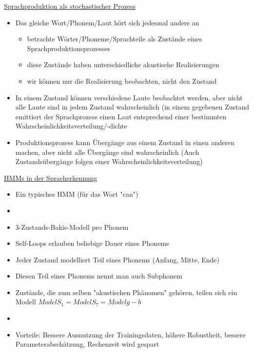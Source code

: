 \documentclass[a4paper,10pt,oneside]{article}
\begin{document}
\underline{Sprachproduktion als stochastischer Prozess} \\
	\begin{itemize}
		\item Das gleiche Wort/Phonem/Laut hört sich jedesmal anders an
			\begin{itemize}
				\item betrachte Wörter/Phoneme/Sprachteile als Zustände eines Sprachproduktionsprozesses
				\item diese Zustände haben unterschiedliche akustische Realisierungen
				\item wir können nur die Realisierung beobachten, nicht den Zustand
			\end{itemize}
		\item In einem Zustand können verschiedene Laute beobachtet werden, aber nicht alle Laute sind in jedem Zustand wahrscheinlich (in einem gegebenen Zustand emittiert der Sprachprozess einen Laut entsprechend einer bestimmten Wahrscheinlichkeitsverteilung/-dichte
		\item Produktionsprozess kann Übergänge aus einem Zustand in einen anderen machen, aber nicht alle Übergänge sind wahrscheinlich (Auch Zustandsübergänge folgen einer Wahrscheinlichkeitsverteilung)
	\end{itemize}
	
\underline{HMMs in der Spracherkennung} \\
	\begin{itemize}
		\item Ein typisches HMM (für das Wort "can")
		\item[] %
		\item 3-Zustands-Bakis-Modell pro Phonem
		\item Self-Loops erlauben beliebige Dauer eines Phonems
		\item Jeder Zustand modelliert Teil eines Phonems (Anfang, Mitte, Ende)
		\item Diesen Teil eines Phonems nennt man auch Subphonem
		\item Zustände, die zum selben "akustischen Phänomen" gehören, teilen sich ein Modell $Model S_1 = Model S_7 = Model g-b$ 
		\item[] %
		\item Vorteile: Bessere Ausnutzung der Trainingsdaten, höhere Robustheit, bessere Parameterabschätzung, Rechenzeit wird gespart
	\end{itemize}
\end{document}
